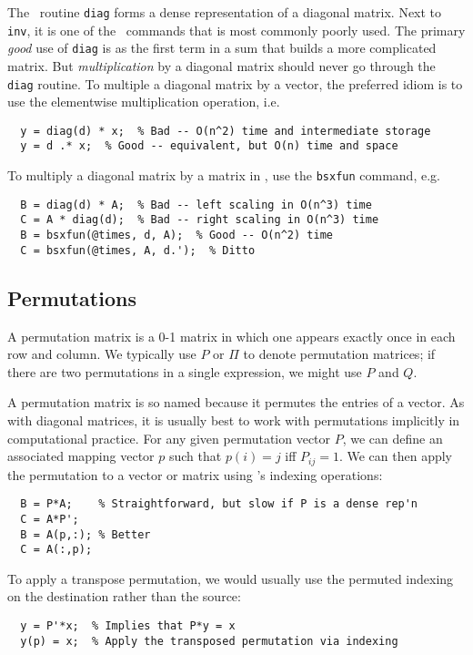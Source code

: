 The \matlab\ routine {\tt diag} forms a dense representation of a
diagonal matrix.  Next to {\tt inv}, it is one of the \matlab\ commands
that is most commonly poorly used.  The primary {\em good} use of
{\tt diag} is as the first term in a sum that builds a more complicated matrix.
But {\em multiplication} by a diagonal matrix should never go through the
{\tt diag} routine.  To multiple a diagonal matrix by a vector, the preferred
idiom is to use the elementwise multiplication operation, i.e.
\begin{lstlisting}
  y = diag(d) * x;  % Bad -- O(n^2) time and intermediate storage
  y = d .* x;  % Good -- equivalent, but O(n) time and space
\end{lstlisting}
To multiply a diagonal matrix by a matrix in \matlab, use the {\tt bsxfun}
command, e.g.
\begin{lstlisting}
  B = diag(d) * A;  % Bad -- left scaling in O(n^3) time
  C = A * diag(d);  % Bad -- right scaling in O(n^3) time
  B = bsxfun(@times, d, A);  % Good -- O(n^2) time
  C = bsxfun(@times, A, d.');  % Ditto
\end{lstlisting}

\subsection{Permutations}

A permutation matrix is a 0-1 matrix in which one appears exactly
once in each row and column.  We typically use $P$ or $\Pi$ to
denote permutation matrices; if there are two permutations in a
single expression, we might use $P$ and $Q$.

A permutation matrix is so named because it permutes the entries
of a vector.  As with diagonal matrices, it is usually best to
work with permutations implicitly in computational practice.
For any given permutation vector $P$, we can define an associated
mapping vector $p$ such that $p(i) = j$ iff $P_{ij} = 1$.  We can
then apply the permutation to a vector or matrix using \matlab's
indexing operations:
\begin{lstlisting}
  B = P*A;    % Straightforward, but slow if P is a dense rep'n
  C = A*P';
  B = A(p,:); % Better
  C = A(:,p);
\end{lstlisting}
To apply a transpose permutation, we would usually use the permuted
indexing on the destination rather than the source:
\begin{lstlisting}
  y = P'*x;  % Implies that P*y = x
  y(p) = x;  % Apply the transposed permutation via indexing
\end{lstlisting}

